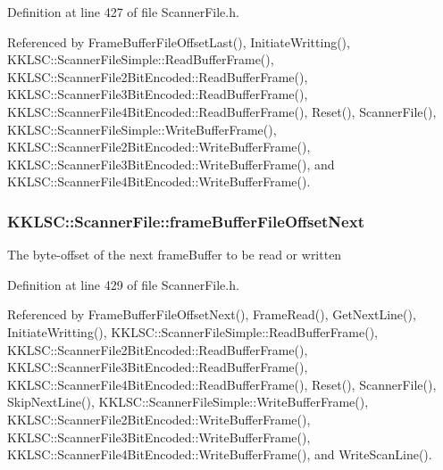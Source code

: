 Definition at line 427 of file Scanner\+File.\+h.



Referenced by Frame\+Buffer\+File\+Offset\+Last(), Initiate\+Writting(), K\+K\+L\+S\+C\+::\+Scanner\+File\+Simple\+::\+Read\+Buffer\+Frame(), K\+K\+L\+S\+C\+::\+Scanner\+File2\+Bit\+Encoded\+::\+Read\+Buffer\+Frame(), K\+K\+L\+S\+C\+::\+Scanner\+File3\+Bit\+Encoded\+::\+Read\+Buffer\+Frame(), K\+K\+L\+S\+C\+::\+Scanner\+File4\+Bit\+Encoded\+::\+Read\+Buffer\+Frame(), Reset(), Scanner\+File(), K\+K\+L\+S\+C\+::\+Scanner\+File\+Simple\+::\+Write\+Buffer\+Frame(), K\+K\+L\+S\+C\+::\+Scanner\+File2\+Bit\+Encoded\+::\+Write\+Buffer\+Frame(), K\+K\+L\+S\+C\+::\+Scanner\+File3\+Bit\+Encoded\+::\+Write\+Buffer\+Frame(), and K\+K\+L\+S\+C\+::\+Scanner\+File4\+Bit\+Encoded\+::\+Write\+Buffer\+Frame().

\subsubsection[{\texorpdfstring{frame\+Buffer\+File\+Offset\+Next}{frameBufferFileOffsetNext}}]{ K\+K\+L\+S\+C\+::\+Scanner\+File\+::frame\+Buffer\+File\+Offset\+Next\hspace{0.3cm}{\ttfamily [protected]}}\hypertarget{class_k_k_l_s_c_1_1_scanner_file_a76318219aaf8142be8a0dfb1705c7430}{}\label{class_k_k_l_s_c_1_1_scanner_file_a76318219aaf8142be8a0dfb1705c7430}
The byte-\/offset of the next frame\+Buffer to be read or written 

Definition at line 429 of file Scanner\+File.\+h.



Referenced by Frame\+Buffer\+File\+Offset\+Next(), Frame\+Read(), Get\+Next\+Line(), Initiate\+Writting(), K\+K\+L\+S\+C\+::\+Scanner\+File\+Simple\+::\+Read\+Buffer\+Frame(), K\+K\+L\+S\+C\+::\+Scanner\+File2\+Bit\+Encoded\+::\+Read\+Buffer\+Frame(), K\+K\+L\+S\+C\+::\+Scanner\+File3\+Bit\+Encoded\+::\+Read\+Buffer\+Frame(), K\+K\+L\+S\+C\+::\+Scanner\+File4\+Bit\+Encoded\+::\+Read\+Buffer\+Frame(), Reset(), Scanner\+File(), Skip\+Next\+Line(), K\+K\+L\+S\+C\+::\+Scanner\+File\+Simple\+::\+Write\+Buffer\+Frame(), K\+K\+L\+S\+C\+::\+Scanner\+File2\+Bit\+Encoded\+::\+Write\+Buffer\+Frame(), K\+K\+L\+S\+C\+::\+Scanner\+File3\+Bit\+Encoded\+::\+Write\+Buffer\+Frame(), K\+K\+L\+S\+C\+::\+Scanner\+File4\+Bit\+Encoded\+::\+Write\+Buffer\+Frame(), and Write\+Scan\+Line().

